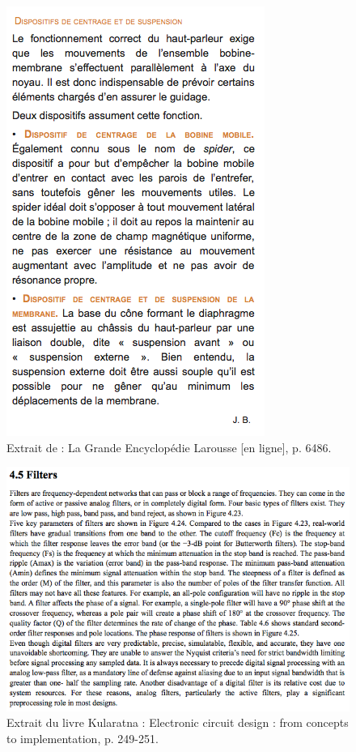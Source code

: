 \begin{figure}[h]
\begin{center}
\includegraphics[scale = 0.5]{img/Larousse-1}
\end{center}
\caption{Extrait de \cite{Larousse} : La Grande Encyclopédie Larousse [en ligne], p. 6486.} %
\label{Trace 4}
\end{figure}

\begin{figure}[h]
\begin{center}
\includegraphics[scale=0.7]{img/Kularatna-1}
\end{center}
\caption{Extrait du livre {Kularatna} : Electronic circuit design : from concepts to implementation, p. 249-251.} %
\label{Trace 5}
\end{figure}

